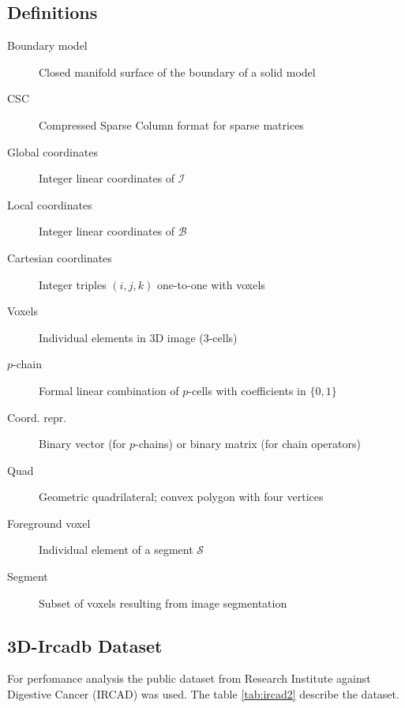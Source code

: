 \subsection{Definitions}
\begin{description}
\item[Boundary model] Closed manifold surface of the boundary of a solid model
\vspace{-2.5mm}\item[CSC]  Compressed Sparse Column format for sparse matrices
\vspace{-2.5mm}\item[Global coordinates]  Integer linear coordinates of $\mathcal{I}$
\vspace{-2.5mm}\item[Local coordinates] Integer linear coordinates of $\mathcal{B}$
\vspace{-2.5mm}\item[Cartesian coordinates] Integer triples $(i,j,k)$ one-to-one with voxels
\vspace{-2.5mm}\item[Voxels] Individual elements in 3D image (3-cells)
\vspace{-2.5mm}\item[$p$-chain] Formal linear combination of $p$-cells with coefficients in $\{0,1\}$
\vspace{-2.5mm}\item[Coord. repr.]  Binary vector (for $p$-chains) or binary matrix (for chain operators)
\vspace{-2.5mm}\item[Quad]	Geometric quadrilateral; convex polygon with four vertices
\vspace{-2.5mm}\item[Foreground voxel] Individual element of a segment $\mathcal{S}$
\vspace{-2.5mm}\item[Segment]	Subset of voxels resulting from image segmentation
\end{description}

\subsection{3D-Ircadb Dataset}

For perfomance analysis the public dataset from Research Institute against Digestive Cancer (IRCAD) \cite{ircadb} was used. 
The table 
\ref{tab:ircad2} describe the dataset.

